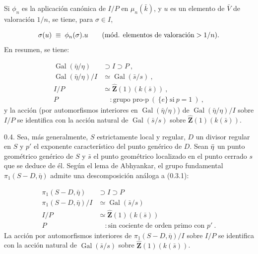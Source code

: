 
Si $\phi_n$ es la aplicación canónica de $I/P$ en $\mu_n(\bar{k})$, y $u$ es un elemento de $\bar{V}$ de valoración $1/n$, se tiene, para $\sigma \in I$,

\begin{equation*}
\sigma(u) \;\equiv\; \phi_n(\sisi{u}{\sigma}).u \qquad (\text{mód. elementos de valoración} > 1/n).
\end{equation*}
En resumen, se tiene:

\begin{equation}\tag{0.3.1}
\begin{aligned}
\operatorname{Gal}(\bar\eta/\eta) &\supset I \supset P \ , \\
\operatorname{Gal}(\bar\eta/\eta)/I &\simeq \operatorname{Gal}(\bar s/s) \ , \\
I/P &\simeq \hat{\mathbf{Z}}(1)(k(\bar s)) \ , \\
P &\quad : \text{grupo pro-p} \ (\ \{e\} \ \text{si} \ p = 1 \ ) \ ,
\end{aligned}
\end{equation}
y la acción (por automorfismos interiores en $\operatorname{Gal}(\bar\eta/\eta)$) de $\operatorname{Gal}(\bar\eta/\eta)/I$ sobre $I/P$ se identifica con la acción natural de $\operatorname{Gal}(\bar s/s)$ sobre $\hat{\mathbf{Z}}(1)(k(\bar s))$.

0.4.  Sea, más generalmente, $S$ estrictamente local y regular, $D$ un divisor regular en $S$ y $p'$ el exponente característico del punto genérico de $D$. Sean $\sisi{\eta}{\bar\eta}$ un punto geométrico genérico de $S$ y $\bar s$ el punto geométrico localizado en el punto cerrado $s$ que se deduce de él. Según el lema de Abhyankar, el grupo fundamental $\pi_1(S\!-\!D,\bar\eta)$ admite una descomposición análoga a (0.3.1):

\begin{equation}\tag{0.4.1}
\begin{aligned}
\pi_1(S\!-\!D,\bar\eta) &\supset I \supset P \\
\pi_1(S\!-\!D,\bar\eta)/I &\simeq \operatorname{Gal}(\bar s/s) \\
I/P &\simeq \hat{\mathbf{Z}}(1)(k(\bar s)) \\
P &\quad : \text{sin cociente de orden primo con } p' \ .
\end{aligned}
\end{equation}
La acción por automorfismos interiores de $\pi_1(S\!-\!D,\bar\eta)/I$ sobre $I/P$ se identifica con la acción natural de $\operatorname{Gal}(\bar s/s)$ sobre $\hat{\mathbf{Z}}(1)(k(\bar s))$.


